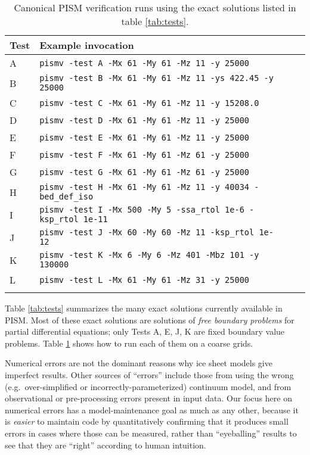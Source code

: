 \begin{table}[ht]
\centering
\caption{Canonical PISM  verification runs using the exact solutions listed in table \ref{tab:tests}.}\label{tab:tests-exec}
\small
\begin{tabular}{@{}llll}\toprule
\textbf{Test} & \textbf{Example invocation}  \\ \midrule
A & \texttt{pismv -test A -Mx 61 -My 61 -Mz 11 -y 25000} \\
B & \texttt{pismv -test B -Mx 61 -My 61 -Mz 11 -ys 422.45 -y 25000}  \\
C & \texttt{pismv -test C -Mx 61 -My 61 -Mz 11 -y 15208.0}  \\
D & \texttt{pismv -test D -Mx 61 -My 61 -Mz 11 -y 25000}  \\
E & \texttt{pismv -test E -Mx 61 -My 61 -Mz 11 -y 25000}  \\
F & \texttt{pismv -test F -Mx 61 -My 61 -Mz 61 -y 25000}  \\
G & \texttt{pismv -test G -Mx 61 -My 61 -Mz 61 -y 25000}  \\
H & \texttt{pismv -test H -Mx 61 -My 61 -Mz 11 -y 40034 -bed_def_iso} \\
I & \texttt{pismv -test I -Mx 500 -My 5 -ssa_rtol 1e-6 -ksp_rtol 1e-11} \\
J & \texttt{pismv -test J -Mx 60 -My 60 -Mz 11 -ksp_rtol 1e-12} \\
K & \texttt{pismv -test K -Mx 6 -My 6 -Mz 401 -Mbz 101 -y 130000} \\
L & \texttt{pismv -test L -Mx 61 -My 61 -Mz 31 -y 25000} \\
\bottomrule
\normalsize
\end{tabular}
\end{table}

Table \ref{tab:tests} summarizes the many exact solutions currently available in PISM.  Most of these exact solutions are solutions of \emph{free boundary problems} for partial differential equations; only Tests A, E, J, K are fixed boundary value problems.  Table \ref{tab:tests-exec} shows how to run each of them on a coarse grids.

Numerical errors are not the dominant reasons why ice sheet models give imperfect results.  Other sources of ``errors'' include those from using the wrong (e.g.~over-simplified or incorrectly-parameterized) continuum model, and from observational or pre-processing errors present in input data.  Our focus here on numerical errors has a model-maintenance goal as much as any other, because it is \emph{easier} to maintain code by quantitatively confirming that it produces small errors in cases where those can be measured, rather than ``eyeballing'' results to see that they are ``right'' according to human intuition.


